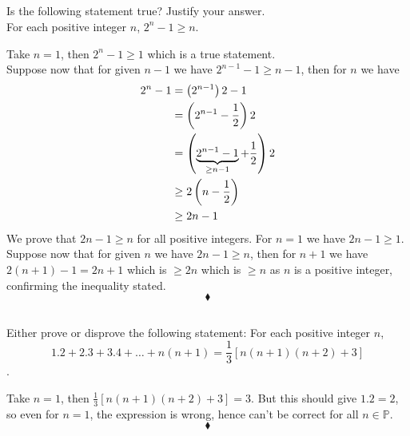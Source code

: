 \subsection{}
\begin{tcolorbox}
 Is the following statement true? Justify your answer. \\For each positive integer $n$, $2^n -1\ge n$. 
\end{tcolorbox}
$$ $$
Take $n=1$, then $2^n -1\ge 1$ which is a true statement.\\
Suppose now that for  given $n-1$ we have  $2^{n-1} -1\ge n-1$, then for $n$ we have 
\begin{align*}
2^{n} -1&= \left(2^{n-1}\right)2-1\\
&= \left(2^{n-1}-\frac{1}{2}\right)2\\
&= \left(\underbrace{2^{n-1}-1}_{\ge n-1}+\frac{1}{2}\right)2\\
&\ge 2\left(n-\frac{1}{2}\right)\\
&\ge 2n-1
\end{align*}
We prove that $2n-1\ge n$ for all positive integers.
For $n=1$ we have $2n-1\ge 1$.\\
Suppose now that for  given $n$ we have  $2n-1\ge n$, then for $n+1$ we have $2(n+1)-1 = 2n+1$ which is $\ge 2n$ which is $\ge n$ as $n$ is a positive integer, confirming the inequality stated.
$$\blacklozenge$$
\subsection{}
\begin{tcolorbox}
 Either prove or disprove the following statement: For each positive integer $n$, $$1 . 2 + 2 . 3 + 3 . 4 +\dots  + n(n + 1) =\frac{1}{3}\left[n(n + 1)(n+2)+3\right]$$. 
\end{tcolorbox}
$$ $$
Take $n=1$, then $\frac{1}{3}\left[n(n + 1)(n+2)+3\right]= 3$. But this should give $1.2=2$, so even for $n=1$, the expression is wrong, hence can't be correct for all $n\in \mathbb{P}$. 
$$\blacklozenge$$
